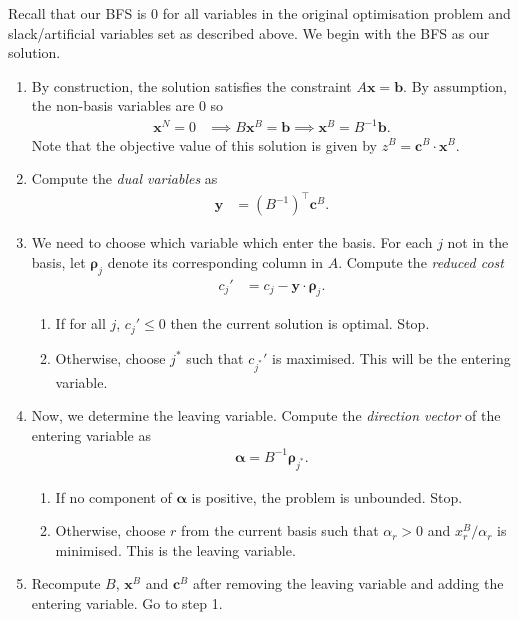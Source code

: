 \documentclass[12pt,a4paper]{article} %
\begin{document}
Recall that our BFS is $0$ for all variables in the 
original optimisation problem and slack/artificial variables set as described above.
We begin with the BFS as our solution. 
\begin{enumerate}
    \item By construction, the solution satisfies 
    the constraint $A\bm x = \bm b$. By assumption, 
    the non-basis variables are $0$ so 
    \begin{align*}
        \bm x^N = 0 &\implies B\bm x^B = \bm b \implies \bm x^B = B^{-1} \bm b.
    \end{align*} 
    Note that the objective value of this solution is given by $z^B = \bm c^B \cdot \bm x^B$.
    \item Compute the \textit{dual variables} as 
    \begin{align*}
        \bm y &= (B^{-1})^\top \bm c^B.
    \end{align*}
    \item We need to choose which variable which enter the basis. 
    For each $j$ not in the basis, let $\bm\rho_j$ denote its corresponding 
    column in $A$. Compute the \textit{reduced cost}
    \begin{align*}
        c_j' &= c_j - \bm y \cdot \bm\rho_j.
    \end{align*}
    \begin{enumerate}
        \item If for all $j$, $c_j' \le 0$ then the current solution is optimal. Stop.
        \item Otherwise, choose $j^*$ such that $c_{j^*}'$ is maximised. 
        This will be the entering variable.
    \end{enumerate}
    \item Now, we determine the leaving variable. Compute the \textit{direction vector}
    of the entering variable as 
    \begin{align*}
        \bm \alpha = B^{-1} \bm \rho_{j^*}.
    \end{align*}
    \begin{enumerate}
        \item If no component of $\bm \alpha$ is positive, the problem is unbounded. Stop.
        \item Otherwise, choose $r$ from the current basis such that $\alpha_r > 0$ 
        and $x^B_r / \alpha_r$ is minimised. This is the leaving variable.
    \end{enumerate}
    \item Recompute $B$, $\bm x^B$ and $\bm c^B$ after removing the leaving variable 
    and adding the entering variable. Go to step 1.

\end{enumerate}
\end{document}
